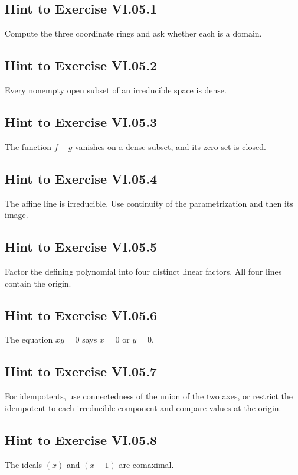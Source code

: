 
\subsection*{Hint to Exercise VI.05.1}
Compute the three coordinate rings and ask whether each is a domain.

\subsection*{Hint to Exercise VI.05.2}
Every nonempty open subset of an irreducible space is dense.

\subsection*{Hint to Exercise VI.05.3}
The function \(f-g\) vanishes on a dense subset, and its zero set is closed.

\subsection*{Hint to Exercise VI.05.4}
The affine line is irreducible.  Use continuity of the parametrization and then its image.

\subsection*{Hint to Exercise VI.05.5}
Factor the defining polynomial into four distinct linear factors.  All four lines contain
the origin.

\subsection*{Hint to Exercise VI.05.6}
The equation \(xy=0\) says \(x=0\) or \(y=0\).

\subsection*{Hint to Exercise VI.05.7}
For idempotents, use connectedness of the union of the two axes, or restrict the idempotent
to each irreducible component and compare values at the origin.

\subsection*{Hint to Exercise VI.05.8}
The ideals \((x)\) and \((x-1)\) are comaximal.

